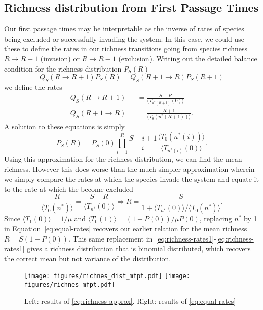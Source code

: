 \documentclass[%
 amsmath,amssymb,
 reprint,%
]{revtex4-2}
\begin{document}
\begin{widetext}
\section{Richness distribution from First Passage Times}
Our first passage times may be interpretable as the inverse of rates of species being excluded or successfully invading the system. 
In this case, we could use these to define the rates in our richness transitions going from species richness $R \rightarrow R+1$ (invasion) or $R \rightarrow R-1$ (exclusion).
Writing out the detailed balance condition for the richness distribution $P_S(R)$
\begin{equation}
    Q_S(R\rightarrow R+1)P_S(R) = Q_S(R+1\rightarrow R)P_S(R+1)
\end{equation}
we define the rates
\begin{eqnarray}
    Q_S(R\rightarrow R+1) && = \frac{S-R}{\langle T_{n^{*}(R+1)}(0)\rangle}\\
    \label{eq:richness-rates1}
    Q_S(R+1\rightarrow R)&& = \frac{R+1}{\langle T_{0}(n^{*}(R+1))\rangle}.
    \label{eq:richness-rates2}
\end{eqnarray}
A solution to these equations is simply
\begin{equation}
    P_S(R) = P_S(0) \prod_{i=1}^R \frac{S-i+1}{i}\frac{\langle T_{0}(n^{*}(i))\rangle}{\langle T_{n^{*}(i)}(0)\rangle}.
    \label{eq:richness-approx}
\end{equation}
Using this approximation for the richness distribution, we can find the mean richness.
However this does worse than the much simpler approximation wherein we simply compare the rates at which the species invade the system and equate it to the rate at which the become excluded
\begin{equation}
    \frac{R}{\langle T_0(n^*) \rangle} = \frac{S-R}{\langle T_{n^*}(0) \rangle} \Rightarrow R = \frac{S}{1+\langle T_{n^*}(0) \rangle/\langle T_0(n^*) \rangle}.
    \label{eq:equal-rates}
\end{equation}
Since $\langle T_1(0) \rangle=1/\mu$ and $\langle T_0(1) \rangle=(1-P(0))/\mu P(0)$, replacing $n^*$ by 1 in Equation~\ref{eq:equal-rates} recovers our earlier relation for the mean richness $R=S(1-P(0))$.
This same replacement in~\ref{eq:richness-rates1}-\ref{eq:richness-rates1} gives a richness distribution that is binomial distributed, which recovers the correct mean but not variance of the distribution.
\begin{figure}[h]
\texttt{[image: figures/richnes\_dist\_mfpt.pdf]}
\texttt{[image: figures/richnes\_mfpt.pdf]}
\caption{Left: results of \ref{eq:richness-approx}. Right: results of \ref{eq:equal-rates}}
\label{det_eigvec}
\end{figure}


\end{widetext}
\end{document}
